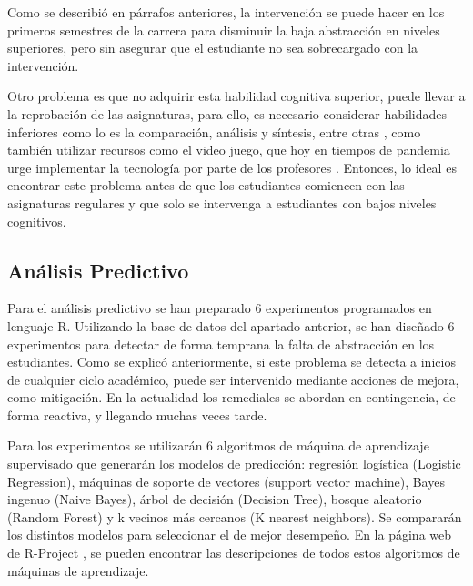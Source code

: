 \documentclass{textolivre}
\begin{document}
Como se describió en párrafos anteriores, la intervención se puede hacer en los primeros semestres de la carrera para disminuir la baja abstracción en niveles superiores, pero sin asegurar que el estudiante no sea sobrecargado con la intervención.

Otro problema es que no adquirir esta habilidad cognitiva superior, puede llevar a la reprobación de las asignaturas, para ello, es necesario considerar habilidades inferiores como lo es la comparación, análisis y síntesis, entre otras \cite{beas2014, aravenagaete2021},  %
como también utilizar recursos como el video juego, que hoy en tiempos de pandemia urge implementar la tecnología por parte de los profesores \cite{aznardiaz2017}. %
Entonces, lo ideal es encontrar este problema antes de que los estudiantes comiencen con las asignaturas regulares y que solo se intervenga a estudiantes con bajos niveles cognitivos.

\subsection{Análisis Predictivo}
Para el análisis predictivo se han preparado 6 experimentos programados en lenguaje R. \cite{chambers1992} %
Utilizando la base de datos del apartado anterior, se han diseñado 6 experimentos para detectar de forma temprana la falta de abstracción en los estudiantes. Como se explicó anteriormente, si este problema se detecta a inicios de cualquier ciclo académico, puede ser intervenido mediante acciones de mejora, como mitigación. En la actualidad los remediales se abordan en contingencia, de forma reactiva, y llegando muchas veces tarde.

Para los experimentos se utilizarán 6 algoritmos de máquina de aprendizaje supervisado que generarán los modelos de predicción: regresión logística (Logistic Regression), máquinas de soporte de vectores (support vector machine), Bayes ingenuo (Naive Bayes),  árbol de decisión (Decision Tree), bosque aleatorio (Random Forest) y k vecinos más cercanos (K nearest neighbors). Se compararán los distintos modelos para seleccionar el de mejor desempeño. En la página web de R-Project \cite{chambers1992}, %
se pueden encontrar las descripciones de todos estos algoritmos de máquinas de aprendizaje.
\end{document}
